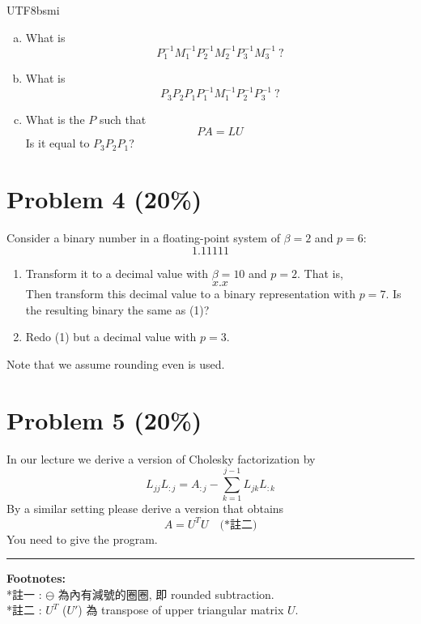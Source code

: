 \documentclass[12pt,a4paper]{article}
\begin{document}
\begin{CJK*}{UTF8}{bsmi}
\begin{enumerate}[(a)]
    \item What is
    \[ P_1^{-1} M_1^{-1} P_2^{-1} M_2^{-1} P_3^{-1} M_3^{-1} \ ? \]
    
    \item What is
    \[ P_3 P_2 P_1 P_1^{-1} M_1^{-1} P_2^{-1} P_3^{-1} \ ? \]
    
    \item What is the $P$ such that
    \[ P A = L U \]
    Is it equal to $P_3 P_2 P_1$?
\end{enumerate}

\vspace{0.5cm}

\section*{Problem 4 (20\%)}
Consider a binary number in a floating-point system of $\beta=2$ and $p=6$:
\[ 1.11111 \]

\begin{enumerate}[(1)]
    \item Transform it to a decimal value with $\beta=10$ and $p=2$. That is,
    \[ x.x \]
    Then transform this decimal value to a binary representation with $p=7$. Is the resulting binary the same as (1)?
    
    \item Redo (1) but a decimal value with $p=3$.
\end{enumerate}

\noindent Note that we assume rounding even is used.

\vspace{0.5cm}

\section*{Problem 5 (20\%)}
In our lecture we derive a version of Cholesky factorization by
\[ L_{jj} L_{:j} = A_{:j} - \sum_{k=1}^{j-1} L_{jk} L_{:k} \]
By a similar setting please derive a version that obtains
\[ A = U^T U \quad \text{(*註二)} \]
You need to give the program.

\vspace{1cm}
\hrule
\vspace{0.5cm}

\noindent \textbf{Footnotes:} \\
*註一 : $\ominus$ 為內有減號的圈圈, 即 rounded subtraction. \\
*註二 : $U^T$ ($U'$) 為 transpose of upper triangular matrix $U$.

\end{CJK*}
\end{document}
